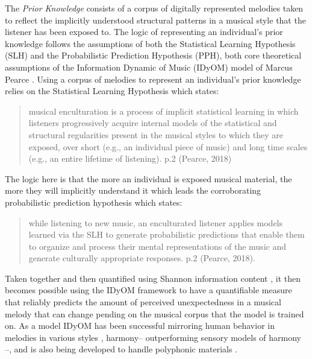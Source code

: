 \documentclass[]{book}
\begin{document}
The \emph{Prior Knowledge} consists of a corpus of digitally represented melodies taken to reflect the implicitly understood structural patterns in a musical style that the listener has been exposed to.
The logic of representing an individual's prior knowledge follows the assumptions of both the Statistical Learning Hypothesis (SLH) and the Probabilistic Prediction Hypothesis (PPH), both core theoretical assumptions of the Information Dynamic of Music (IDyOM) model of Marcus Pearce \citep{pearceConstructionEvaluationStatistical2005, pearceStatisticalLearningProbabilistic2018a}.
Using a corpus of melodies to represent an individual's prior knowledge relies on the Statistical Learning Hypothesis which states:

\begin{quote}
musical enculturation is a process of implicit statistical learning in which listeners progressively acquire internal models of the statistical and structural regularities present in the musical styles to which they are exposed, over short (e.g., an individual piece of music) and long time scales (e.g., an entire lifetime of listening). p.2 (Pearce, 2018)
\end{quote}

The logic here is that the more an individual is exposed musical material, the more they will implicitly understand it which leads the corroborating probabilistic prediction hypothesis which states:

\begin{quote}
while listening to new music, an enculturated listener applies models learned via the SLH to generate probabilistic predictions that enable them to organize and process their mental representations of the music and generate culturally appropriate responses. p.2 (Pearce, 2018).
\end{quote}

Taken together and then quantified using Shannon information content \citep{shannonMathematicalTheoryCommunication1948}, it then becomes possible using the IDyOM framework to have a quantifiable measure that reliably predicts the amount of perceived unexpectedness in a musical melody that can change pending on the musical corpus that the model is trained on.
As a model IDyOM has been successful mirroring human behavior in melodies in various styles \citep{pearceStatisticalLearningProbabilistic2018a}, harmony-- outperforming \citep{harrisonDissociatingSensoryCognitive2018} sensory models of harmony \citep{bigandEmpiricalEvidenceMusical2014}--, and is also being developed to handle polyphonic materials \citep{sauvePredictionPolyphonyModelling2017}.
\end{document}
